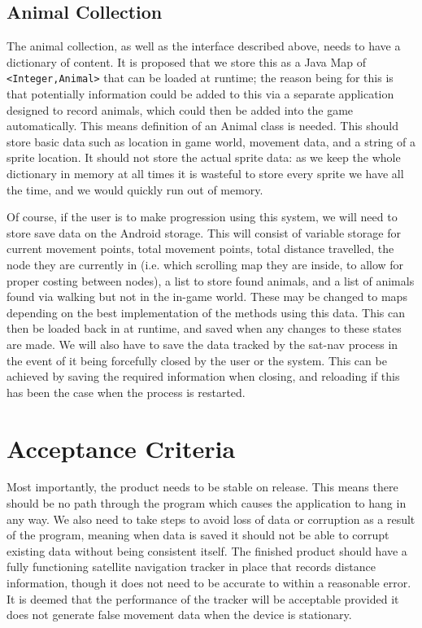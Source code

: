 \documentclass[12pt,a4paper,twoside]{article}
\begin{document}
\subsection{Animal Collection}
The animal collection, as well as the interface described above, needs to have a dictionary of content.
It is proposed that we store this as a Java Map of \verb|<Integer,Animal>| that can be loaded at runtime; the reason being for this is that potentially information could be added to this via a separate application designed to record animals, which could then be added into the game automatically.
This means definition of an Animal class is needed.
This should store basic data such as location in game world, movement data, and a string of a sprite location. It should not store the actual sprite data: as we keep the whole dictionary in memory at all times it is wasteful to store every sprite we have all the time, and we would quickly run out of memory.


Of course, if the user is to make progression using this system, we will need to store save data on the Android storage.
This will consist of variable storage for current movement points, total movement points, total distance travelled, the node they are currently in (i.e. which scrolling map they are inside, to allow for proper costing between nodes), a list to store found animals, and a list of animals found via walking but not in the in-game world.
These may be changed to maps depending on the best implementation of the methods using this data.
This can then be loaded back in at runtime, and saved when any changes to these states are made.
We will also have to save the data tracked by the sat-nav process in the event of it being forcefully closed by the user or the system.
This can be achieved by saving the required information when closing, and reloading if this has been the case when the process is restarted.

\section{Acceptance Criteria}
Most importantly, the product needs to be stable on release.
This means there should be no path through the program which causes the application to hang in any way.
We also need to take steps to avoid loss of data or corruption as a result of the program, meaning when data is saved it should not be able to corrupt existing data without being consistent itself.
The finished product should have a fully functioning satellite navigation tracker in place that records distance information, though it does not need to be accurate to within a reasonable error.
It is deemed that the performance of the tracker will be acceptable provided it does not generate false movement data when the device is stationary.
\end{document}
